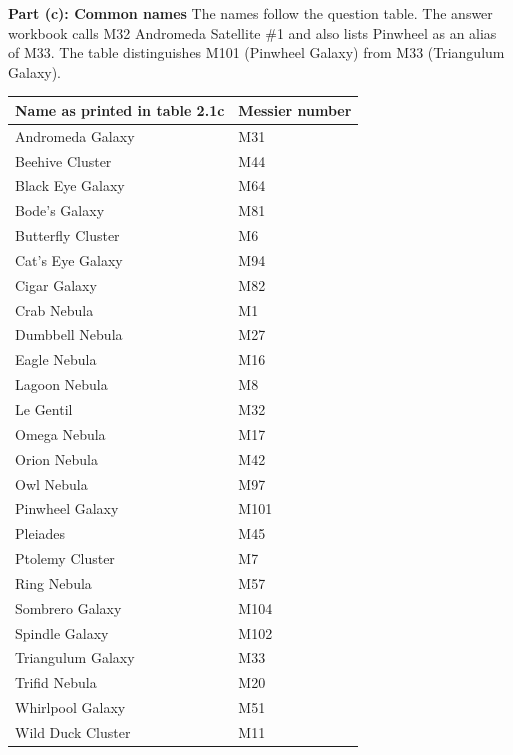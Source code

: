 \textbf{Part (c): Common names}
The names follow the question table. The answer workbook calls M32 Andromeda Satellite \#1 and also lists Pinwheel as an alias of M33. The table distinguishes M101 (Pinwheel Galaxy) from M33 (Triangulum Galaxy).
\begin{longtable}{@{}ll@{}}
\toprule
Name as printed in table 2.1c & Messier number\\
\midrule
\endhead
\bottomrule
\endfoot
Andromeda Galaxy & M31\\
Beehive Cluster & M44\\
Black Eye Galaxy & M64\\
Bode's Galaxy & M81\\
Butterfly Cluster & M6\\
Cat's Eye Galaxy & M94\\
Cigar Galaxy & M82\\
Crab Nebula & M1\\
Dumbbell Nebula & M27\\
Eagle Nebula & M16\\
Lagoon Nebula & M8\\
Le Gentil & M32\\
Omega Nebula & M17\\
Orion Nebula & M42\\
Owl Nebula & M97\\
Pinwheel Galaxy & M101\\
Pleiades & M45\\
Ptolemy Cluster & M7\\
Ring Nebula & M57\\
Sombrero Galaxy & M104\\
Spindle Galaxy & M102\\
Triangulum Galaxy & M33\\
Trifid Nebula & M20\\
Whirlpool Galaxy & M51\\
Wild Duck Cluster & M11\\
\end{longtable}

